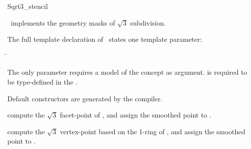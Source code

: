 \begin{ccRefClass}{Sqrt3_stencil}

\ccDefinition

\ccClassTemplateName\ implements the geometry masks 
of $\sqrt{3}$ subdivision. 


\ccParameters

The full template declaration of \ccClassTemplateName\ states one
template parameter:

\begin{tabbing}
 \= 
\end{tabbing}
   
The only parameter requires a model of 
the  concept as argument. 
 is required to be type-defined in the 
.

\ccCreation

Default constructors are generated by the compiler.

\ccThree{}{}{}

{compute the $\sqrt{3}$ facet-point of , and assign 
the smoothed point to .}

{compute the $\sqrt{3}$ vertex-point based on the 1-ring of , 
and assign the smoothed point to .}


\ccSeeAlso

\\
\\
\\

\end{ccRefClass}

\ccRefPageEnd

